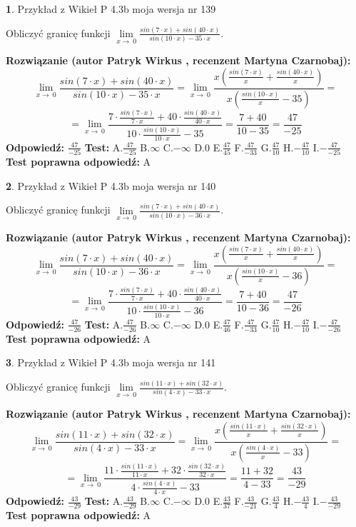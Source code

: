 \documentclass[12pt, a4paper]{article}
\theoremstyle{definition} %
\newtheorem{zad}{}
\newcommand{\zadStart}[1]{\begin{zad}#1\newline}
\newcommand{\zadStop}{\end{zad}}
\newcommand{\rozwStart}[2]{\noindent \textbf{Rozwiązanie (autor #1 , recenzent #2): }\newline}
\newcommand{\rozwStop}{\newline}
\newcommand{\odpStart}{\noindent \textbf{Odpowiedź:}\newline}
\newcommand{\odpStop}{\newline}
\newcommand{\testStart}{\noindent \textbf{Test:}\newline}
\newcommand{\testStop}{\newline}
\newcommand{\kluczStart}{\noindent \textbf{Test poprawna odpowiedź:}\newline}
\newcommand{\kluczStop}{\newline}
\begin{document}
\zadStart{Przykład z Wikieł P 4.3b moja wersja nr 139}


Obliczyć granicę funkcji $\lim\limits_{x\to\ 0}\frac{sin(7 \cdot x)+sin(40 \cdot x)}{sin(10 \cdot x)-35 \cdot x}$.
\zadStop
\rozwStart{Patryk Wirkus}{Martyna Czarnobaj}
$$\lim\limits_{x\to\ 0}\frac{sin(7 \cdot x)+sin(40 \cdot x)}{sin(10 \cdot x)-35 \cdot x}=\lim\limits_{x\to\ 0}\frac{x(\frac{sin(7 \cdot x)}{x}+\frac{sin(40 \cdot x)}{x})}{x(\frac{sin(10 \cdot x)}{x}-35)}=$$
$$=\lim\limits_{x\to\ 0}\frac{7 \cdot \frac{sin(7 \cdot x)}{7 \cdot x}+40 \cdot \frac{sin(40 \cdot x)}{40 \cdot x}}{10 \cdot \frac{sin(10 \cdot x)}{10 \cdot x}-35}=\frac{7+40}{10-35} = \frac{47}{-25}$$
\rozwStop
\odpStart
$\frac{47}{-25}$
\odpStop
\testStart
A.$\frac{47}{-25}$
B.$\infty$
C.$-\infty$
D.$0$
E.$\frac{47}{45}$
F.$\frac{47}{-33}$
G.$\frac{47}{10}$
H.$-\frac{47}{10}$
I.$-\frac{47}{-25}$
\testStop
\kluczStart
A
\kluczStop



\zadStart{Przykład z Wikieł P 4.3b moja wersja nr 140}


Obliczyć granicę funkcji $\lim\limits_{x\to\ 0}\frac{sin(7 \cdot x)+sin(40 \cdot x)}{sin(10 \cdot x)-36 \cdot x}$.
\zadStop
\rozwStart{Patryk Wirkus}{Martyna Czarnobaj}
$$\lim\limits_{x\to\ 0}\frac{sin(7 \cdot x)+sin(40 \cdot x)}{sin(10 \cdot x)-36 \cdot x}=\lim\limits_{x\to\ 0}\frac{x(\frac{sin(7 \cdot x)}{x}+\frac{sin(40 \cdot x)}{x})}{x(\frac{sin(10 \cdot x)}{x}-36)}=$$
$$=\lim\limits_{x\to\ 0}\frac{7 \cdot \frac{sin(7 \cdot x)}{7 \cdot x}+40 \cdot \frac{sin(40 \cdot x)}{40 \cdot x}}{10 \cdot \frac{sin(10 \cdot x)}{10 \cdot x}-36}=\frac{7+40}{10-36} = \frac{47}{-26}$$
\rozwStop
\odpStart
$\frac{47}{-26}$
\odpStop
\testStart
A.$\frac{47}{-26}$
B.$\infty$
C.$-\infty$
D.$0$
E.$\frac{47}{46}$
F.$\frac{47}{-33}$
G.$\frac{47}{10}$
H.$-\frac{47}{10}$
I.$-\frac{47}{-26}$
\testStop
\kluczStart
A
\kluczStop



\zadStart{Przykład z Wikieł P 4.3b moja wersja nr 141}


Obliczyć granicę funkcji $\lim\limits_{x\to\ 0}\frac{sin(11 \cdot x)+sin(32 \cdot x)}{sin(4 \cdot x)-33 \cdot x}$.
\zadStop
\rozwStart{Patryk Wirkus}{Martyna Czarnobaj}
$$\lim\limits_{x\to\ 0}\frac{sin(11 \cdot x)+sin(32 \cdot x)}{sin(4 \cdot x)-33 \cdot x}=\lim\limits_{x\to\ 0}\frac{x(\frac{sin(11 \cdot x)}{x}+\frac{sin(32 \cdot x)}{x})}{x(\frac{sin(4 \cdot x)}{x}-33)}=$$
$$=\lim\limits_{x\to\ 0}\frac{11 \cdot \frac{sin(11 \cdot x)}{11 \cdot x}+32 \cdot \frac{sin(32 \cdot x)}{32 \cdot x}}{4 \cdot \frac{sin(4 \cdot x)}{4 \cdot x}-33}=\frac{11+32}{4-33} = \frac{43}{-29}$$
\rozwStop
\odpStart
$\frac{43}{-29}$
\odpStop
\testStart
A.$\frac{43}{-29}$
B.$\infty$
C.$-\infty$
D.$0$
E.$\frac{43}{37}$
F.$\frac{43}{-21}$
G.$\frac{43}{4}$
H.$-\frac{43}{4}$
I.$-\frac{43}{-29}$
\testStop
\kluczStart
A
\kluczStop
\end{document}
